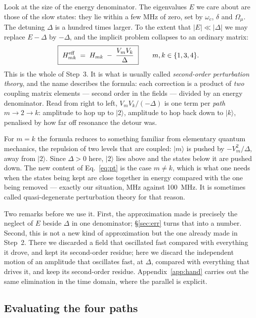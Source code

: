 \documentclass[11pt,a4paper]{article}
\newcommand{\ket}[1]{\lvert #1 \rangle}
\newcommand{\Omu}{\Omega_{\mu}}
\begin{document}
Look at the size of the energy denominator. The eigenvalues $E$ we care about are those of the
slow states: they lie within a few MHz of zero, set by $\omega_c$, $\delta$ and $\Omu$. The
detuning $\Delta$ is a hundred times larger. To the extent that $|E|\ll|\Delta|$ we may replace
$E-\Delta$ by $-\Delta$, and the implicit problem collapses to an ordinary matrix:
\begin{equation}
  \boxed{\ H^{\rm eff}_{mk} \;=\; H_{mk} \;-\; \frac{V_m V_k}{\Delta}\ }
  \qquad m,k\in\{1,3,4\}.
  \label{eq:pt}
\end{equation}
This is the whole of Step~3. It is what is usually called \emph{second-order perturbation
theory}, and the name describes the formula: each correction is a product of \emph{two} coupling
matrix elements --- second order in the fields --- divided by an energy denominator. Read from
right to left, $V_mV_k/(-\Delta)$ is one term per \emph{path} $m\to2\to k$: amplitude to hop up
to $\ket{2}$, amplitude to hop back down to $\ket{k}$, penalised by how far off resonance the
detour was.

For $m=k$ the formula reduces to something familiar from elementary quantum mechanics, the
repulsion of two levels that are coupled: $\ket{m}$ is pushed by $-V_m^2/\Delta$, away from
$\ket{2}$. Since $\Delta>0$ here, $\ket{2}$ lies above and the states below it are pushed down.
The new content of Eq.~\eqref{eq:pt} is the case $m\neq k$, which is what one needs when the
states being kept are close together in energy compared with the one being removed --- exactly
our situation, MHz against 100~MHz. It is sometimes called quasi-degenerate perturbation theory
for that reason.

Two remarks before we use it. First, the approximation made is precisely the neglect of $E$
beside $\Delta$ in one denominator; \S\ref{sec:err} turns that into a number. Second, this is
not a new kind of approximation but the one already made in Step~2. There we discarded a field
that oscillated fast compared with everything it drove, and kept its second-order residue; here
we discard the independent motion of an amplitude that oscillates fast, at $\Delta$, compared
with everything that drives it, and keep its second-order residue. Appendix~\ref{app:hand}
carries out the same elimination in the time domain, where the parallel is explicit.

\subsection{Evaluating the four paths}
\label{sec:paths}
\end{document}
